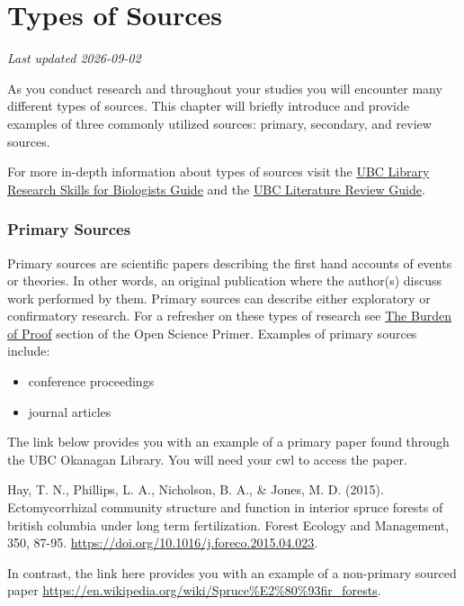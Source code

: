 \documentclass[
]{book}
\providecommand{\tightlist}{%
  \setlength{\itemsep}{0pt}\setlength{\parskip}{0pt}}
\begin{document}
\chapter{Types of Sources}\label{types-of-sources}

\emph{Last updated 2026-09-02}

As you conduct research and throughout your studies you will encounter many different types of sources. This chapter will briefly introduce and provide examples of three commonly utilized sources: primary, secondary, and review sources.

For more in-depth information about types of sources visit the \href{https://guides.library.ubc.ca/c.php?g=704417&p=5011059}{UBC Library Research Skills for Biologists Guide} and the \href{https://guides.library.ubc.ca/litreviews}{UBC Literature Review Guide}.

\subsection*{Primary Sources}\label{primary-sources}

Primary sources are scientific papers describing the first hand accounts of events or theories. In other words, an original publication where the author(s) discuss work performed by them. Primary sources can describe either exploratory or confirmatory research. For a refresher on these types of research see \href{https://ubco-biology.github.io/OS-Introduction/the-burden-of-proof.html}{The Burden of Proof} section of the Open Science Primer. Examples of primary sources include:

\begin{itemize}
\tightlist
\item
  conference proceedings
\item
  journal articles
\end{itemize}

The link below provides you with an example of a primary paper found through the UBC Okanagan Library. You will need your cwl to access the paper.

Hay, T. N., Phillips, L. A., Nicholson, B. A., \& Jones, M. D. (2015). Ectomycorrhizal community structure and function in interior spruce forests of british columbia under long term fertilization. Forest Ecology and Management, 350, 87-95. \url{https://doi.org/10.1016/j.foreco.2015.04.023}.

In contrast, the link here provides you with an example of a non-primary sourced paper \url{https://en.wikipedia.org/wiki/Spruce\%E2\%80\%93fir_forests}.
\end{document}
